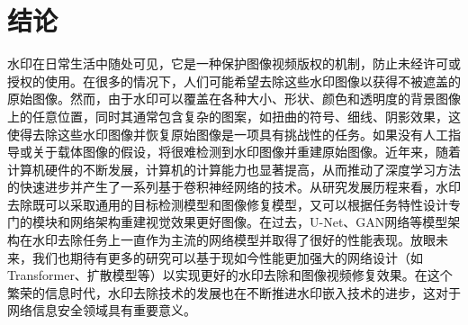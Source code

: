 \section{结论}
\label{sec:conclusion}

水印在日常生活中随处可见，它是一种保护图像视频版权的机制，防止未经许可或授权的使用。在很多的情况下，人们可能希望去除这些水印图像以获得不被遮盖的原始图像。然而，由于水印可以覆盖在各种大小、形状、颜色和透明度的背景图像上的任意位置，同时其通常包含复杂的图案，如扭曲的符号、细线、阴影效果，这使得去除这些水印图像并恢复原始图像是一项具有挑战性的任务。如果没有人工指导或关于载体图像的假设，将很难检测到水印图像并重建原始图像。近年来，随着计算机硬件的不断发展，计算机的计算能力也显著提高，从而推动了深度学习方法的快速进步并产生了一系列基于卷积神经网络的技术。从研究发展历程来看，水印去除既可以采取通用的目标检测模型和图像修复模型，又可以根据任务特性设计专门的模块和网络架构重建视觉效果更好图像。在过去，U-Net、GAN网络等模型架构在水印去除任务上一直作为主流的网络模型并取得了很好的性能表现。放眼未来，我们也期待有更多的研究可以基于现如今性能更加强大的网络设计（如 Transformer、扩散模型等）以实现更好的水印去除和图像视频修复效果。在这个繁荣的信息时代，水印去除技术的发展也在不断推进水印嵌入技术的进步，这对于网络信息安全领域具有重要意义。